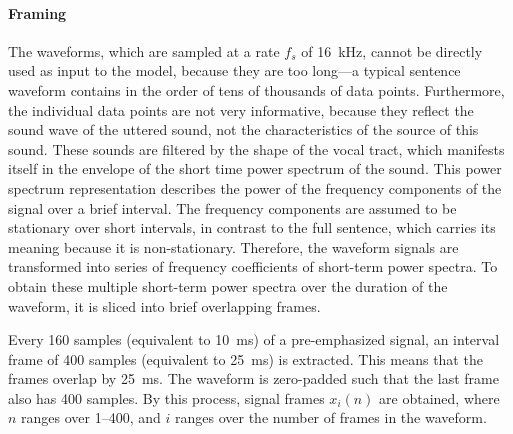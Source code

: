 		\paragraph{Framing}
			The waveforms, which are sampled at a rate $f_s$ of \SI{16}{\kHz}, cannot be directly used as input to the model, because they are too long---a typical sentence waveform contains in the order of tens of thousands of data points.
			Furthermore, the individual data points are not very informative, because they reflect the sound wave of the uttered sound, not the characteristics of the source of this sound.
			These sounds are filtered by the shape of the vocal tract, which manifests itself in the envelope of the short time power spectrum of the sound.
			This power spectrum representation describes the power of the frequency components of the signal over a brief interval.
			The frequency components are assumed to be stationary over short intervals, in contrast to the full sentence, which carries its meaning because it is non-stationary.
			Therefore, the waveform signals are transformed into series of frequency coefficients of short-term power spectra.
			To obtain these multiple short-term power spectra over the duration of the waveform, it is sliced into brief overlapping frames.

			Every 160 samples (equivalent to \SI{10}{ms}) of a pre-emphasized signal, an interval frame of 400 samples (equivalent to \SI{25}{ms}) is extracted.
			This means that the frames overlap by \SI{25}{ms}.
			The waveform is zero-padded such that the last frame also has 400 samples.
			By this process, signal frames $x_i(n)$ are obtained, where $n$ ranges over 1--400, and $i$ ranges over the number of frames in the waveform.

